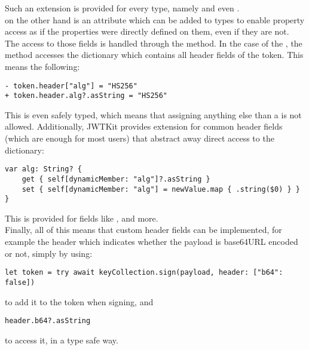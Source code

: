 Such an extension is provided for every type, namely  and even . \\
 on the other hand is an attribute which can be added to types to enable property access as if the properties were directly defined on them, even if they are not. The access to those fields is handled through the  method. In the case of the , the method accesses the  dictionary which contains all header fields of the token. This means the following:
\begin{verbatim}
- token.header["alg"] = "HS256"
+ token.header.alg?.asString = "HS256"
\end{verbatim}
This is even safely typed, which means that assigning anything else than a  is not allowed. \cite{dml-proposal}
Additionally, JWTKit provides extension for common header fields (which are enough for most users) that abstract away direct access to the dictionary:
\begin{verbatim}
var alg: String? {
    get { self[dynamicMember: "alg"]?.asString }
    set { self[dynamicMember: "alg"] = newValue.map { .string($0) } }
}
\end{verbatim}
This is provided for fields like ,  and more. \\
Finally,  all of this means that custom header fields can be implemented, for example the  header which indicates whether the payload is base64URL encoded or not, simply by using:
\begin{verbatim}
let token = try await keyCollection.sign(payload, header: ["b64": false])
\end{verbatim}
to add it to the token when signing, and 
\begin{verbatim}
header.b64?.asString
\end{verbatim}
to access it, in a type safe way. \cite{jwtkit} \cite{rfc7515-jws}

